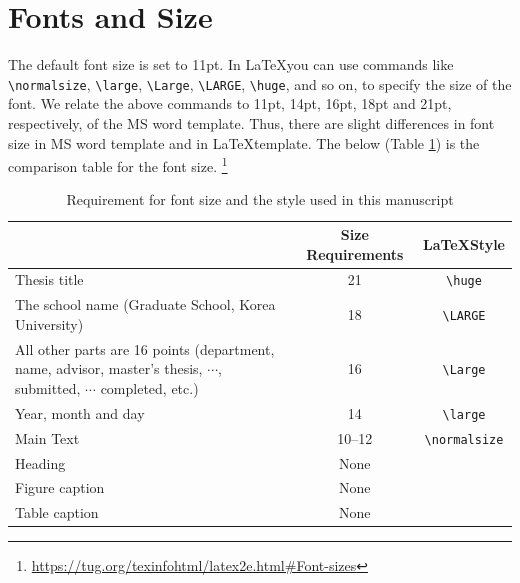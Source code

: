 \documentclass{report}
\begin{document}
\section{Fonts and Size}\label{sec:font}

The default font size is set to 11pt.
In \LaTeX you can use commands like \verb|\normalsize|, \verb|\large|, \verb|\Large|, \verb|\LARGE|, \verb|\huge|, and so on, to specify the size of the font.
We relate the above commands to 11pt, 14pt, 16pt, 18pt and 21pt, respectively, of the MS word template.
Thus, there are slight differences in font size in MS word template and in \LaTeX template.
The below (Table \ref{tab:font size}) is the comparison table for the font size.
\footnote{\url{https://tug.org/texinfohtml/latex2e.html#Font-sizes}}

\bigskip

\begin{table}[h]\centering
\caption{Requirement for font size and the style used in this manuscript}\label{tab:font size}
\bigskip
\begin{tabular}{>{\centering\arraybackslash}p{6cm}cc}
\hline
&Size Requirements&\LaTeX Style\\\hline
Thesis title			&21&\verb|\huge|\\\hline
The school name (Graduate School, Korea University)
					&18&\verb|\LARGE|\\\hline
All other parts are 16 points (department, name, advisor, master's thesis, \(\cdots\), submitted, \(\cdots\) completed, etc.)	
					&16&\verb|\Large|\\\hline
Year, month and day	&14&\verb|\large|\\\hline
Main Text			&10--12&\verb|\normalsize|\\\hline
Heading				&None&\\\hline
Figure caption			&None&\\\hline
Table caption			&None&\\\hline
\end{tabular}
\end{table}

\end{document}
